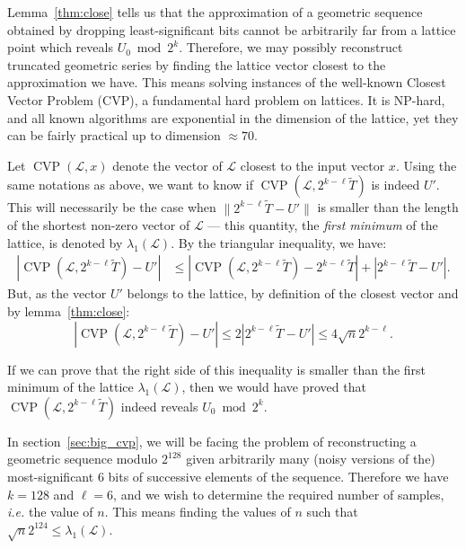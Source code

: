 \documentclass[submission,svgnames,journal=tosc]{iacrtrans}
\DeclareMathOperator{\CVP}{CVP}
\begin{document}
Lemma~\ref{thm:close} tells us that the approximation of a geometric sequence
obtained by dropping least-significant bits cannot be arbitrarily far from a
lattice point which reveals $U_0 \bmod 2^k$. Therefore, we may possibly
reconstruct truncated geometric series by finding the lattice vector closest to
the approximation we have. This means solving instances of the well-known
\textsf{Closest Vector Problem} (CVP), a fundamental hard problem on
lattices. It is NP-hard, and all known algorithms are exponential in the
dimension of the lattice, yet they can be fairly practical up to dimension
$\approx 70$.

Let $\CVP(\mathcal{L}, x)$ denote the vector of $\mathcal{L}$ closest to the
input vector $x$. Using the same notations as above, we want to know if
$\CVP\left(\mathcal{L}, 2^{k-\ell}\widetilde{T}\right)$ is indeed $U'$. This
will necessarily be the case when $\|2^{k-\ell}\widetilde{T} - U'\|$ is smaller
than the length of the shortest non-zero vector of $\mathcal{L}$ --- this quantity,
the \emph{first minimum} of the lattice, is denoted by $\lambda_1(\mathcal{L})$.
By the triangular inequality, we have:
\begin{align*}
|\CVP(\mathcal{L}, 2^{k-\ell}\widetilde{T}) - U'| %
                             & \leq \left| \CVP\left(\mathcal{L}, 2^{k-\ell}\widetilde{T} \right) - 2^{k-\ell}\widetilde{T}\right | + \left|2^{k-\ell}\widetilde{T} - U'\right|.
\end{align*}
But, as the vector $U'$ belongs to the lattice, by definition of the closest
vector and by lemma~\ref{thm:close}:
\[
  |\CVP(\mathcal{L}, 2^{k-\ell}\widetilde{T}) - U'| \leq 2 \left|2^{k-\ell} \widetilde{T} - U' \right| \leq 4 \sqrt{n} 2^{k-\ell}.
\]

If we can prove that the right side of this inequality is smaller than the first
minimum of the lattice $\lambda_1(\mathcal{L})$, then we would have proved that
$\CVP(\mathcal{L}, 2^{k-\ell}\widetilde{T})$ indeed reveals $U_0 \bmod 2^k$.

In section~\ref{sec:big_cvp}, we will be facing the problem of reconstructing a
geometric sequence modulo $2^{128}$ given arbitrarily many (noisy versions of
the) most-significant $6$ bits of successive elements of the sequence. Therefore
we have $k=128$ and $\ell=6$, and we wish to determine the required number of
samples, \textit{i.e.} the value of $n$. This means finding the values of $n$
such that $\sqrt{n} 2^{124} \leq \lambda_1\left(\mathcal{L}\right)$.
\end{document}
